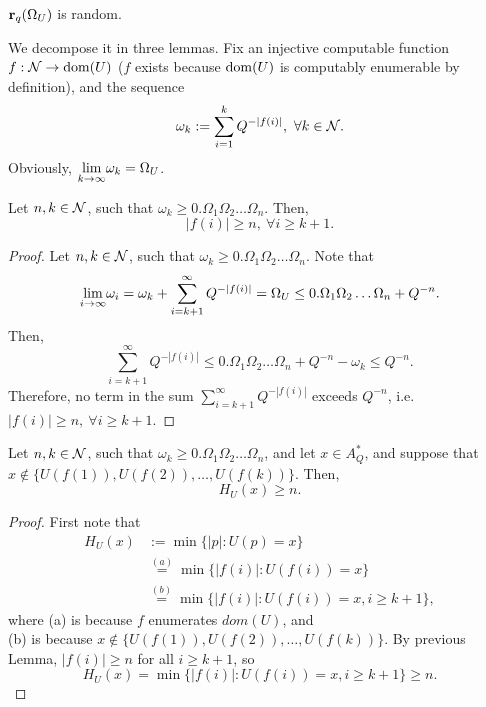 \documentclass{article}
\begin{document}
\begin{theorem}
    ${\bf r}_q(\Omega_U)$ is random.
\end{theorem}
We decompose it in three lemmas. Fix an injective computable function $f : \mathcal{N} \to \operatorname{dom} (U)$ ($f$ exists because $\operatorname{dom} (U)$ is computably enumerable by definition), and the sequence
\begin{equation}
    \omega_k := \sum_{i=1}^k Q^{-|f(i)|}, \ \forall k \in \mathcal{N}.
\end{equation}
Obviously, $\underset{k \to \infty}{\lim} \omega_k = \Omega_U$.
\begin{lemma}
    Let $n,k \in \mathcal{N}$, such that $\omega_k \geq 0.\Omega_1\Omega_2\ldots\Omega_n$. Then,
    \begin{equation}
        |f(i)| \geq n, \ \forall i \geq k + 1.
    \end{equation}
\end{lemma}
\begin{proof}
    Let $n,k \in \mathcal{N}$, such that $\omega_k \geq 0.\Omega_1\Omega_2\ldots\Omega_n$. Note that 
    \begin{equation}
        \underset{i \to \infty}{\lim} \omega_i = \omega_k + \sum_{i=k+1}^\infty Q^{-|f(i)|} = \Omega_U \leq 0.\Omega_1\Omega_2\ldots\Omega_n + Q^{-n}.
    \end{equation}
    Then,
    \begin{equation}
        \sum_{i=k+1}^\infty Q^{-|f(i)|} \leq 0.\Omega_1\Omega_2\ldots\Omega_n + Q^{-n} - \omega_k \leq Q^{-n}.
    \end{equation}
    Therefore, no term in the sum $\sum_{i=k+1}^\infty Q^{-|f(i)|}$ exceeds $Q^{-n}$, i.e. $ |f(i)| \geq n, \ \forall i \geq k + 1$. 
\end{proof}
\begin{lemma}
    Let $n,k \in \mathcal{N}$, such that $\omega_k \geq 0.\Omega_1\Omega_2\ldots\Omega_n$, and let $x \in A_Q^\ast$, and suppose that $x \notin \{U(f(1)), U(f(2)), \ldots, U(f(k))\}$. Then,
    \begin{equation}
        H_U(x) \geq n.
    \end{equation}
\end{lemma}
\begin{proof}
    First note that
    \begin{align}
        H_U(x) &:= \min \{|p| : U(p) = x\}\\
        & \overset{(a)}{=}  \min \{|f(i)| : U(f(i)) = x\}\\
        & \overset{(b)}{=} \min \{|f(i)| : U(f(i)) = x, i \geq k + 1\},
    \end{align}
    where (a) is because $f$ enumerates $dom(U)$, and\\ (b) is because $x \notin \{U(f(1)), U(f(2)), \ldots, U(f(k))\}$.
    By previous Lemma, $|f(i)| \geq n$ for all $i \geq k + 1$, so
    \begin{equation}
        H_U(x) = \min \{|f(i)| : U(f(i)) = x, i \geq k + 1\} \geq n.
    \end{equation}
\end{proof}
\end{document}
